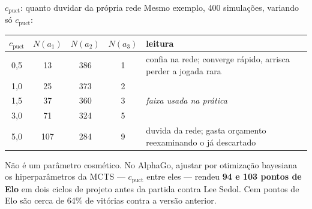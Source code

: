 \documentclass[aspectratio=169, 10pt]{beamer}
\newcommand{\cpuct}{c_{\mathrm{puct}}}
\newcommand{\Nvis}{N}
\begin{document}
\begin{frame}{$\cpuct$: quanto duvidar da própria rede}
  \small
  Mesmo exemplo, 400 simulações, variando só $\cpuct$:

  \medskip
  \centering
  \begin{tabular}{cccc l}
    \toprule
    $\cpuct$ & $\Nvis(a_1)$ & $\Nvis(a_2)$ & $\Nvis(a_3)$ & leitura \\
    \midrule
    0,5 & 13  & 386 & 1 & confia na rede; converge rápido, arrisca perder a jogada rara \\
    1,0 & 25  & 373 & 2 & \\
    1,5 & 37  & 360 & 3 & \emph{faixa usada na prática} \\
    3,0 & 71  & 324 & 5 & \\
    5,0 & 107 & 284 & 9 & duvida da rede; gasta orçamento reexaminando o já descartado \\
    \bottomrule
  \end{tabular}

  \medskip
  \begin{ideiabox}
    Não é um parâmetro cosmético. No AlphaGo, ajustar por otimização bayesiana os
    hiperparâmetros da MCTS — $\cpuct$ entre eles — rendeu \textbf{94 e 103 pontos
    de Elo} em dois ciclos de projeto antes da partida contra Lee Sedol. Cem
    pontos de Elo são cerca de 64\% de vitórias contra a versão anterior.
  \end{ideiabox}
\end{frame}
\end{document}

